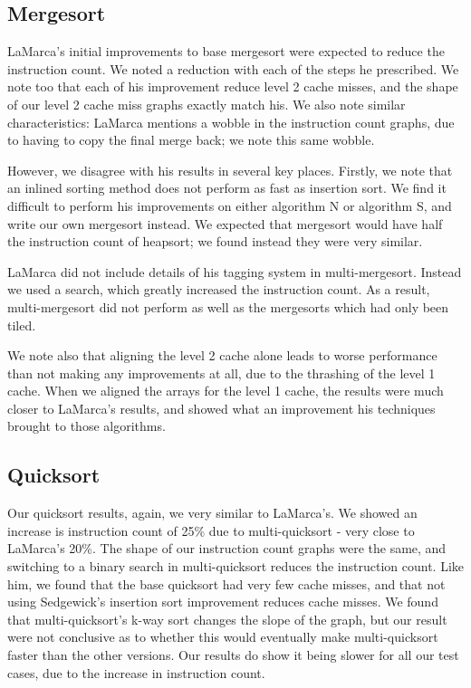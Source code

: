 \subsection{Mergesort}

LaMarca's initial improvements to base mergesort were expected to reduce the
instruction count. We noted a reduction with each of the steps he prescribed. We
note too that each of his improvement reduce level 2 cache misses, and the shape
of our level 2 cache miss graphs exactly match his. We also note similar
characteristics: LaMarca mentions a wobble in the instruction count graphs, due to
having to copy the final merge back; we note this same wobble.

However, we disagree with his results in several key places. Firstly, we note
that an inlined sorting method does not perform as fast as insertion sort. We
find it difficult to perform his improvements on either algorithm N or algorithm
S, and write our own mergesort instead. We expected that mergesort would have
half the instruction count of heapsort; we found instead they were very similar.

LaMarca did not include details of his tagging system in multi-mergesort.
Instead we used a search, which greatly increased the instruction count. As a
result, multi-mergesort did not perform as well as the mergesorts which had only
been tiled. 

We note also that aligning the level 2 cache alone leads to worse
performance than not making any improvements at all, due to the thrashing of the
level 1 cache. When we aligned the arrays for the level 1 cache, the results
were much closer to LaMarca's results, and showed what an improvement his
techniques brought to those algorithms.


\subsection{Quicksort}

Our quicksort results, again, we very similar to LaMarca's. We showed an
increase is instruction count of 25\% due to multi-quicksort - very close to
LaMarca's 20\%. The shape of our instruction count graphs were the same, and
switching to a binary search in multi-quicksort reduces the instruction count.
Like him, we found that the base quicksort had very few cache misses, and that
not using Sedgewick's insertion sort improvement reduces cache misses. We found
that multi-quicksort's k-way sort changes the slope of the graph, but our result
were not conclusive as to whether this would eventually make multi-quicksort
faster than the other versions. Our results do show it being slower for all our
test cases, due to the increase in instruction count.

